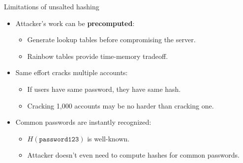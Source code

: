 \documentclass[aspectratio=169, lualatex, handout]{beamer}
\begin{document}
\begin{frame}{Limitations of unsalted hashing}
	\begin{itemize}
		\item Attacker's work can be \textbf{precomputed}:
		      \begin{itemize}
			      \item Generate lookup tables before compromising the server.
			      \item Rainbow tables provide time-memory tradeoff.
		      \end{itemize}
		\item Same effort cracks multiple accounts:
		      \begin{itemize}
			      \item If users have same password, they have same hash.
			      \item Cracking 1,000 accounts may be no harder than cracking one.
		      \end{itemize}
		\item Common passwords are instantly recognized:
		      \begin{itemize}
			      \item $H(\texttt{password123})$ is well-known.
			      \item Attacker doesn't even need to compute hashes for common passwords.
		      \end{itemize}
	\end{itemize}
\end{frame}
\end{document}
